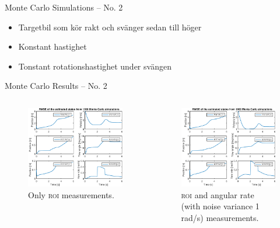 \documentclass{beamer}
\newcommand{\roi}{\textsc{roi}\xspace}
\renewcommand{\aa}{\"a\xspace}
\renewcommand{\o}{\"o\xspace}
\begin{document}
\begin{frame}{Monte Carlo Simulations -- No. 2}
	\note
	{
		\begin{itemize}
			\item Targetbil som k\o{}r rakt och sv\aa{}nger sedan till h\o{}ger
			\item Konstant hastighet
			\item Tonstant rotationshastighet under sv\aa{}ngen
		\end{itemize}
	}
\end{frame}

\begin{frame}{Monte Carlo Results -- No. 2}
	\begin{columns}[T]
	\begin{figure}
		\includegraphics[width=\textwidth]{MC/13_MC_1000_Rmse}
		\caption{Only \roi measurements.}
	\end{figure}
	\begin{figure}
		\includegraphics[width=\textwidth]{MC/25_MC_1000_Rmse}
		\caption{\roi and angular rate (with noise variance 1 rad/s) measurements.}
	\end{figure}
	\end{columns}


\end{frame}
\end{document}
